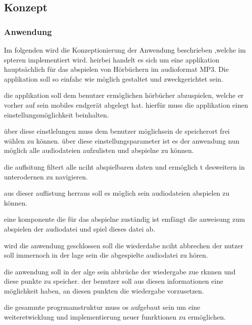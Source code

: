 \subsection{Konzept}
\subsubsection{Anwendung}
Im folgenden wird die Konzeptionierung der Anwendung beschrieben ,welche im spteren implementiert wird. heirbei handelt es sich um eine applikation hauptsächlich für das abspielen von Hörbüchern im audioformat MP3. Die applikation soll so einfahc wie möglich gestaltet und zweckgerichtet sein.

die applikation soll dem benutzer ermöglichen hörbücher abzuspielen, welche er vorher auf sein mobiles endgerät abgelegt hat. hierfür muss die applikation einen einstellungsmöglichkeit beinhalten.

über diese einstlelungen muss dem benutzer möglichsein de speicherort frei wählen zu können. über diese einstellungsparameter ist es der anwendung nun möglich alle audiodateien aufzulisten und abspielne zu können.

die auflsitung filtert alle nciht abspielbaren daten und ermöglich t desweitern in unterodernen zu navigieren.

aus dieser auflistung herraus soll es möglich sein audiodateien abspielen zu können.

eine komponente die für das abspielne zuständig ist emfängt die anweisung zum abspielen der audiodatei und spiel dieses datei ab.

wird die anwendung geschlossen soll die wiederdabe nciht abbrechen der nutzer soll immernoch in der lage sein die abgespielte audiodatei zu hören.

die anwendung soll in der alge sein abbrüche der wiedergabe zue rknnen und diese punkte zu speicher. der benutzer soll aus diesen informationen eine möglichkeit haben, an diesen punkten die wiedergabe vorzusetzen.

die gesammte progrmamstruktur muss os aufgebaut sein um eine weiteretwicklung und implementierung neuer funrktionen zu ermöglichen.
